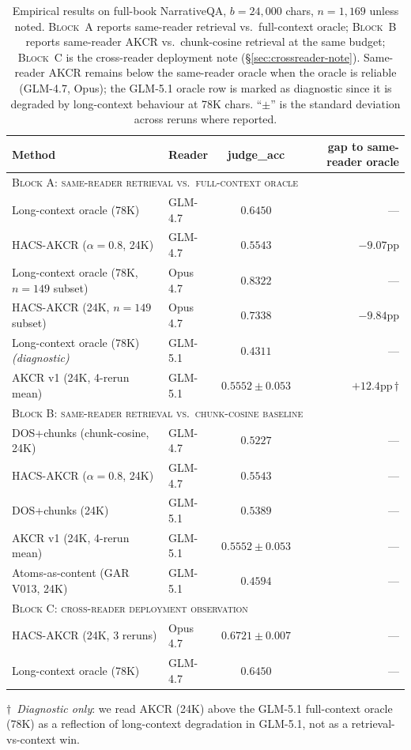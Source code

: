 \documentclass{article}
\theoremstyle{plain}
\theoremstyle{definition}
\theoremstyle{remark}
\begin{document}
\begin{table}[t]
  \caption{Empirical results on full-book NarrativeQA, $b=24{,}000$ chars,
    $n=1{,}169$ unless noted. \textsc{Block~A} reports same-reader retrieval
    vs.\ full-context oracle; \textsc{Block~B} reports same-reader AKCR vs.\
    chunk-cosine retrieval at the same budget; \textsc{Block~C} is the
    cross-reader deployment note (\S\ref{sec:crossreader-note}). Same-reader
    AKCR remains below the same-reader oracle when the oracle is reliable
    (GLM-4.7, Opus); the GLM-5.1 oracle row is marked as diagnostic since
    it is degraded by long-context behaviour at 78K chars. ``$\pm$'' is the
    standard deviation across reruns where reported.}
  \label{tab:headline}
  \vskip 0.05in
  \centering
  \small
  \begin{tabular}{@{}llcr@{}}
    \toprule
    Method & Reader & judge\_acc & gap to same-reader oracle \\
    \midrule
    \multicolumn{4}{l}{\textsc{Block A: same-reader retrieval vs.\ full-context oracle}} \\
    Long-context oracle (78K)        & GLM-4.7 & $0.6450$           & --- \\
    HACS-AKCR ($\alpha\!=\!0.8$, 24K) & GLM-4.7 & $0.5543$           & $-9.07$pp \\
    Long-context oracle (78K, $n\!=\!149$ subset) & Opus 4.7 & $0.8322$ & --- \\
    HACS-AKCR (24K, $n\!=\!149$ subset)            & Opus 4.7 & $0.7338$ & $-9.84$pp \\
    Long-context oracle (78K) \emph{(diagnostic)}   & GLM-5.1 & $0.4311$           & --- \\
    AKCR v1 (24K, 4-rerun mean)       & GLM-5.1 & $0.5552 \pm 0.053$ & $+12.4$pp\,$\dagger$ \\
    \midrule
    \multicolumn{4}{l}{\textsc{Block B: same-reader retrieval vs.\ chunk-cosine baseline}} \\
    DOS+chunks (chunk-cosine, 24K)    & GLM-4.7 & $0.5227$           & --- \\
    HACS-AKCR ($\alpha\!=\!0.8$, 24K) & GLM-4.7 & $0.5543$           & --- \\
    DOS+chunks (24K)                  & GLM-5.1 & $0.5389$           & --- \\
    AKCR v1 (24K, 4-rerun mean)       & GLM-5.1 & $0.5552 \pm 0.053$ & --- \\
    Atoms-as-content (GAR V013, 24K)  & GLM-5.1 & $0.4594$           & --- \\
    \midrule
    \multicolumn{4}{l}{\textsc{Block C: cross-reader deployment observation}} \\
    HACS-AKCR (24K, 3 reruns)          & Opus 4.7 & $0.6721 \pm 0.007$ & --- \\
    Long-context oracle (78K)          & GLM-4.7  & $0.6450$           & --- \\
    \bottomrule
  \end{tabular}

  \medskip
  \footnotesize
  $\dagger$~\emph{Diagnostic only}: we read AKCR (24K) above the GLM-5.1
  full-context oracle (78K) as a reflection of long-context degradation in
  GLM-5.1, not as a retrieval-vs-context win.
\end{table}
\end{document}
